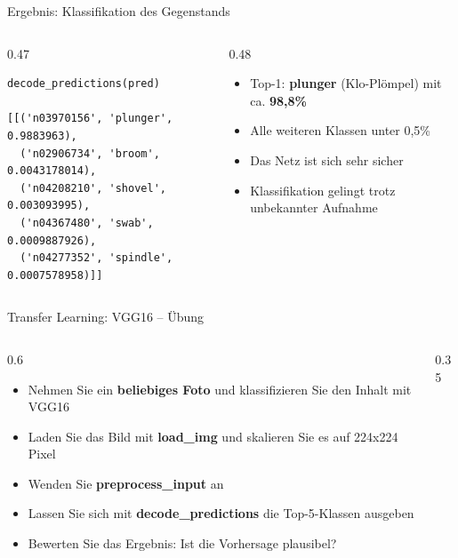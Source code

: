 \begin{frame}[fragile]{Ergebnis: Klassifikation des Gegenstands}
\begin{columns}
\begin{column}{0.47\textwidth}
\begin{verbatim}
decode_predictions(pred)

[[('n03970156', 'plunger', 0.9883963),
  ('n02906734', 'broom', 0.0043178014),
  ('n04208210', 'shovel', 0.003093995),
  ('n04367480', 'swab', 0.0009887926),
  ('n04277352', 'spindle', 0.0007578958)]]
\end{verbatim}
\end{column}
\begin{column}{0.48\textwidth}
\begin{itemize}
  \item Top-1: \textbf{plunger} (Klo-Plömpel) mit ca. \textbf{98,8\%}
  \item Alle weiteren Klassen unter 0,5\%
  \item Das Netz ist sich sehr sicher
  \item Klassifikation gelingt trotz unbekannter Aufnahme
\end{itemize}
\end{column}
\end{columns}
\end{frame}



\begin{frame}{Transfer Learning: VGG16 -- Übung}
\begin{columns}
\begin{column}{0.6\textwidth}
\begin{itemize}
  \item Nehmen Sie ein \textbf{beliebiges Foto} und klassifizieren Sie den Inhalt mit VGG16
  \item Laden Sie das Bild mit \textbf{load\_img} und skalieren Sie es auf 224x224 Pixel
  \item Wenden Sie \textbf{preprocess\_input} an
  \item Lassen Sie sich mit \textbf{decode\_predictions} die Top-5-Klassen ausgeben
  \item Bewerten Sie das Ergebnis: Ist die Vorhersage plausibel?
\end{itemize}
\end{column}
\begin{column}{0.35\textwidth}
\begin{center}
\end{center}
\end{column}
\end{columns}

\end{frame}



